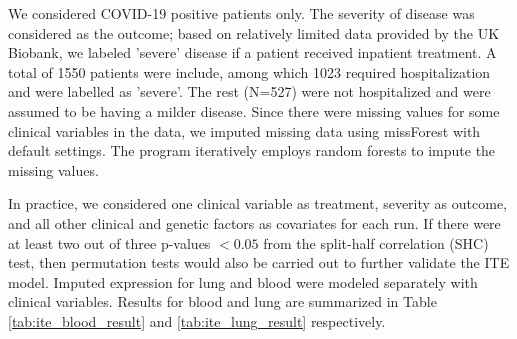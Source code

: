    We considered COVID-19 positive patients only.  The severity of disease was considered as the outcome; based on relatively limited data provided by the UK Biobank, we labeled 'severe' disease if a patient received inpatient treatment.  A total of 1550 patients were include, among which 1023 required hospitalization and were labelled as 'severe'. The rest (N=527) were not hospitalized and were assumed to be having a milder disease. Since there were missing values for some clinical variables in the data, we imputed missing data using missForest \cite{stekhoven2012missforest} with default settings. The program iteratively employs random forests to impute the missing values.

    In practice, we considered one clinical variable as treatment, severity as outcome, and all other clinical and genetic factors as covariates for each run. If there were at least two out of three p-values $< 0.05$ from the split-half correlation (SHC) test, then permutation tests would also be carried out to further validate the ITE model. Imputed expression for lung and blood were modeled separately with clinical variables. Results for blood and lung are summarized in Table \ref{tab:ite_blood_result} and \ref{tab:ite_lung_result} respectively. 

